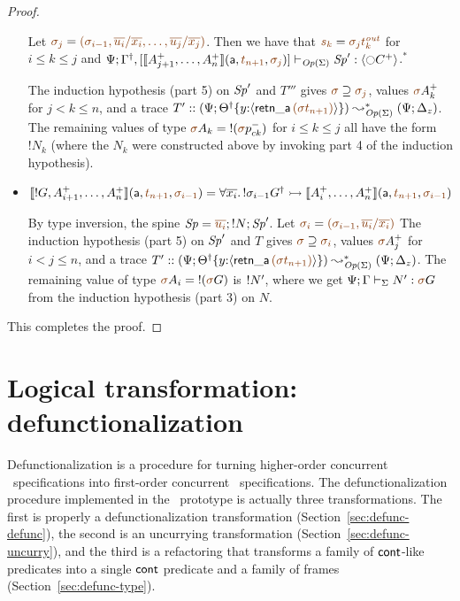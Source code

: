 \begin{proof}
\begin{itemize}
   \smallskip
    
   Let
   $\lf{\sigma_j} = \lf{(\sigma_{i-1},
                   \overline{u_i}/\overline{x_i},\ldots,
                   \overline{u_j}/\overline{x_j})}$.
   Then we have that $\lf{s_k} = \lf{{\sigma_j}t^{\it out}_k}$ 
   for $i \leq k \leq j$ and
   $\slst{\transop{\Sigma}}{\Psi}{\opsubst{\Gamma},[\opbasic{A^+_{j+1},\ldots,A^+_n}{t_{n+1}}{\sigma_{j}}]}{\Sp'}{\susp{{\ocircle}C^+}}$.$^*$

  \smallskip

 The induction 
   hypothesis (part 5) on ${\it Sp}'$ and $T'''$
  gives $\lf{\sigma} \supseteq \lf{\sigma_{j}}$, values
  $\lf{\sigma}{A^+_{k}}$ for $j < k \leq n$, and 
  a trace $T' :: (\Psi; \tackon{\opsubst{\Theta}}{y{:}\susp{{\sf retn\_a}\,\lf{(\sigma t_{n+1})}}})
  \leadsto^*_{\transop{\Sigma}}
 (\Psi; \Delta_z)$. The remaining values of type
   $\lf{\sigma}A_k = {!}(\lf{\sigma}p^-_{ck})$ for $i \leq k \leq j$
   all have the form ${!}N_k$ (where the $N_k$ were constructed above by
   invoking part 4 of the induction hypothesis).
   \bigskip


\item $\opbasic{{!}G,A^+_{i+1},\ldots,A^+_n}{t_{n+1}}{\sigma_{i-1}} = \forall
  \overline{x_i}.\, {!}\sigma_{i-1}\opsubst{G} \lefti
  \opbasic{A^+_i,\ldots,A^+_n}{t_{n+1}}{\sigma_{i-1}}$

  \bigskip
  By type inversion, the spine $\Sp = \lf{\overline{u_i}}; {!}N; \Sp'$. 
  Let $\lf{\sigma_i} = \lf{(\sigma_{i-1}, \overline{u_i}/\overline{x_i})}$
  The induction hypothesis (part 5) on ${\it Sp}'$ and $T$
  gives $\lf{\sigma} \supseteq \lf{\sigma_{i}}$, values
  $\lf{\sigma}{A^+_{j}}$ for $i < j \leq n$, and 
  a trace $T' :: (\Psi; \tackon{\opsubst{\Theta}}{y{:}\susp{{\sf retn\_a}\,\lf{(\sigma t_{n+1})}}})
  \leadsto^*_{\transop{\Sigma}}
 (\Psi; \Delta_z)$. The remaining value of type 
  $\lf\sigma A_i = {!}(\lf{\sigma}G)$
  is ${!}{N'}$, where we get $\slst{\Sigma}{\Psi}{\Gamma}{N'}{\lf{\sigma}{G}}$ from the induction hypothesis (part 3) on $N$.
\end{itemize}

\noindent
This completes the proof.
\end{proof}


\section{Logical transformation: defunctionalization}
\label{sec:defunctionalization}

Defunctionalization is a procedure for turning higher-order concurrent
\sls~specifications into first-order concurrent
\sls~specifications. The defunctionalization procedure implemented in
the \sls~prototype is actually three transformations. The first is
properly a defunctionalization transformation
(Section~\ref{sec:defunc-defunc}), the second is an uncurrying
transformation (Section~\ref{sec:defunc-uncurry}), and the third
is a refactoring that
transforms a family of ${\sf cont}$-like predicates into a single
${\sf cont}$ predicate and a family of frames
(Section~\ref{sec:defunc-type}).

